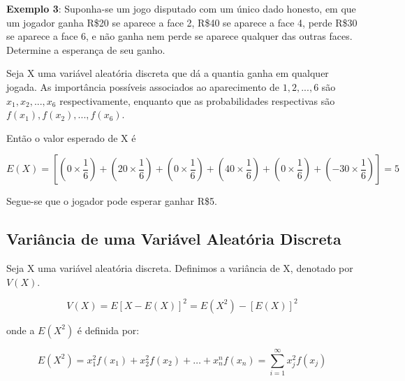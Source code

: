 \textbf{Exemplo 3}: Suponha-se um jogo disputado com um único dado
honesto, em que um jogador ganha R\$20 se aparece a face 2, R\$40
se aparece a face 4, perde R\$30 se aparece a face 6, e não ganha
nem perde se aparece qualquer das outras faces. Determine a
esperança de seu ganho.\vskip0.3cm

Seja X uma variável aleatória discreta que dá a quantia ganha em
qualquer jogada. As importância possíveis associados ao
aparecimento de $1,2,...,6$ são $x_{1},x_{2},...,x_{6}$
respectivamente, enquanto que as probabilidades respectivas são \\ 
$f(x_{1}),f(x_{2}),...,f(x_{6})$.


\begin{table}[!htb]
\end{table}

Então o valor esperado de X é

$$
E(X)= \left[\left(0 \times \frac{1}{6}\right)+\left(20 \times
\frac{1}{6}\right)+ \left(0 \times \frac{1}{6}\right)+ \left(40
\times \frac{1}{6}\right)+\left(0 \times
\frac{1}{6}\right)+\left(-30 \times \frac{1}{6}\right)\right]=5
$$

Segue-se que o jogador pode esperar ganhar R\$5.


\subsection{Variância de uma Variável Aleatória Discreta}

Seja X uma variável aleatória discreta. Definimos a variância de
X, denotado por $V(X)$.

\begin{equation}\label{v(x)}
    V(X) = E[X-E(X)]^{2} = E(X^{2})-[E(X)]^{2}
\end{equation}

onde a $E(X^{2})$ é definida por:

\begin{equation}\label{e(x)}
    E(X^{2}) = x_{1}^{2}f(x_{1})+x_{2}^{2}f(x_{2})+\ldots+x_{n}^{n}f(x_{n})= \sum_{i=1}^{\infty} x_{j}^{2}f(x_{j})
\end{equation}


